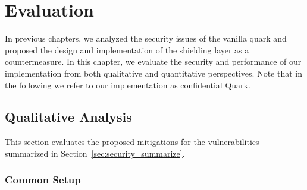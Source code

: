 \chapter{Evaluation}
\label{sec:evaluation}

In previous chapters, we analyzed the security issues of the vanilla quark and proposed the design and implementation of the shielding layer as a countermeasure. In this chapter, we evaluate the security and performance of our implementation from both 
qualitative and quantitative perspectives. Note that in the following we refer to our implementation as confidential Quark.

\section{Qualitative Analysis}
\label{sec:eva_qualitativ}
This section evaluates the proposed mitigations for the vulnerabilities summarized in Section~\ref{sec:security_summarize}.

\subsection{Common Setup}


